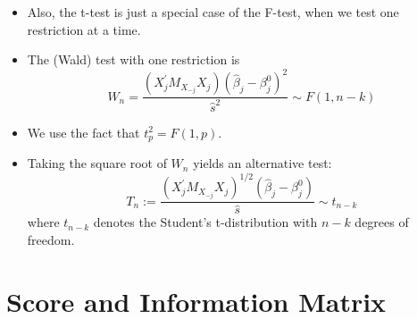 \documentclass[notes=show]{beamer}
\begin{document}
\begin{frame}%


\begin{itemize}
\item Also, the t-test is just a special case of the F-test, when we test
one restriction at a time.

\item The (Wald) test with one restriction is%
\begin{equation}
W_{n}=\frac{\left( X_{j}^{\prime }M_{X_{-j}}X_{j}\right) (\hat{\beta}%
_{j}-\beta _{j}^{0})^{2}}{\widehat{s}^{2}}\sim F\left( 1,n-k\right)
\label{W11}
\end{equation}

\item We use the fact that $t_{p}^{2}=F\left( 1,p\right) .$

\item Taking the square root of $W_{n}$ yields an alternative test:%
\begin{equation}
T_{n}:=\frac{\left( X_{j}^{\prime }M_{X_{-j}}X_{j}\right) ^{1/2}(\hat{\beta}%
_{j}-\beta _{j}^{0})}{\widehat{s}}\sim t_{n-k}  \label{t}
\end{equation}%
where $t_{n-k}$ denotes the Student's t-distribution with $n-k$ degrees of
freedom.
\end{itemize}

\end{frame}%

\section{Score and Information Matrix}
\end{document}
